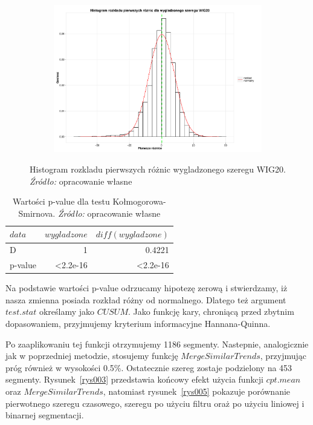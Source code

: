 \documentclass[polish, twoside, 12pt, a4paper]{article}
\theoremstyle{definition}
\theoremstyle{plain}
\theoremstyle{remark}
\begin{document}
\begin{figure}[H]
  \centering

  \begin{subfigure}[t]{1.00\textwidth}
    \includegraphics[width=\textwidth]{./rys016}
  \end{subfigure}

  \captionsetup{margin=10pt,font=small,labelfont=bf,width=.8\textwidth}

  \caption[Histogram rozkladu pierwszych różnic wygladzonego szeregu WIG20]{Histogram rozkladu pierwszych różnic wygladzonego szeregu WIG20. \textit{Źródło:} opracowanie własne}\label{rys016}
\end{figure}

\begin{table}[H] \centering
\caption{Wartości p-value dla testu Kołmogorowa-Smirnova. \textit{Źródło:} opracowanie własne}
\label{tab001}
\begin{tabular}{lrr}
\(data\)    & \(wygladzone\)       & \(diff(wygladzone)\)   \\ \hline
D       & 1                & 0.4221            \\
p-value & \textless2.2e-16 & \textless2.2e-16 
\end{tabular}
\end{table}


Na podstawie wartości p-value odrzucamy hipotezę zerową i stwierdzamy, iż nasza zmienna posiada rozkład różny od normalnego. Dlatego też argument \(test.stat\) określamy jako \(CUSUM\). Jako funkcję 
kary, chroniącą przed zbytnim dopasowaniem, przyjmujemy kryterium informacyjne Hannana-Quinna.

Po zaaplikowaniu tej funkcji otrzymujemy 1186 segmenty. Nastepnie, analogicznie jak w poprzedniej metodzie, stosujemy funkcję \(MergeSimilarTrends\), przyjmując próg również w wysokości 0.5\%. Ostatecznie 
szereg zostaje podzielony na 453 segmenty. Rysunek~\ref{rys003} przedstawia końcowy efekt użycia funkcji \(cpt.mean\) oraz \(MergeSimilarTrends\), natomiast rysunek~\ref{rys005} pokazuje porównanie 
pierwotnego szeregu czasowego, szeregu po użyciu filtru oraż po użyciu liniowej i binarnej segmentacji.
\end{document}
